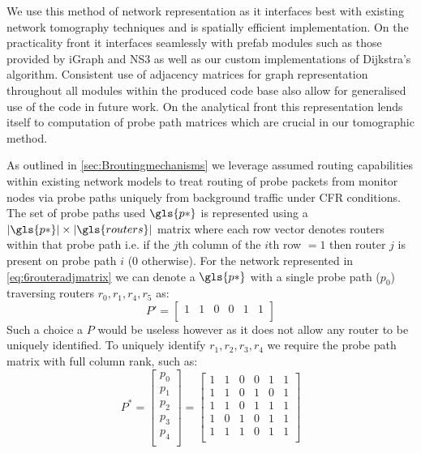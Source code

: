 We use this method of network representation as it interfaces best with existing network tomography techniques and is spatially efficient implementation. On the practicality front it interfaces seamlessly with prefab modules such as those provided by iGraph and NS3 as well as our custom implementations of Dijkstra's algorithm. Consistent use of adjacency matrices for graph representation throughout all modules within the produced code base also allow for generalised use of the code in future work. On the analytical front this representation lends itself to computation of probe path matrices which are crucial in our tomographic method.\par
As outlined in \cref{sec:Broutingmechanisms} we leverage assumed routing capabilities within existing network models to treat routing of probe packets from monitor nodes via probe paths uniquely from background traffic under CFR conditions. The set of probe paths used $\gls{p*}$ is represented using a $|\gls{p*}|\times |\gls{routers}|$ matrix where each row vector denotes routers within that probe path i.e. if the $j$th column of the $i$th row $= 1$ then router $j$ is present on probe path $i$ (0 otherwise). For the network represented in \cref{eq:6routeradjmatrix} we can denote a $\gls{p*}$ with a single probe path ($p_0$) traversing routers $r_0,r_1,r_4,r_5$ as:
\[
    P'=\begin{bmatrix}
        1 & 1 & 0 & 0 & 1 & 1\\ 
    \end{bmatrix}
\]
Such a choice a $P$ would be useless however as it does not allow any router to be uniquely identified. To uniquely identify $r_1,r_2,r_3,r_4$ we require the probe path matrix with full column rank, such as:
\begin{equation}
\label{eq:6routerppaths}
    P^*=\begin{bmatrix}
            p_0 \\
            p_1 \\
            p_2 \\
            p_3 \\
            p_4 \\
    \end{bmatrix} = 
    \begin{bmatrix}
            1 & 1 & 0 & 0 & 1 & 1 \\
            1 & 1 & 0 & 1 & 0 & 1 \\
            1 & 1 & 0 & 1 & 1 & 1 \\
            1 & 0 & 1 & 0 & 1 & 1 \\
            1 & 1 & 1 & 0 & 1 & 1 \\
    \end{bmatrix}
\end{equation}
